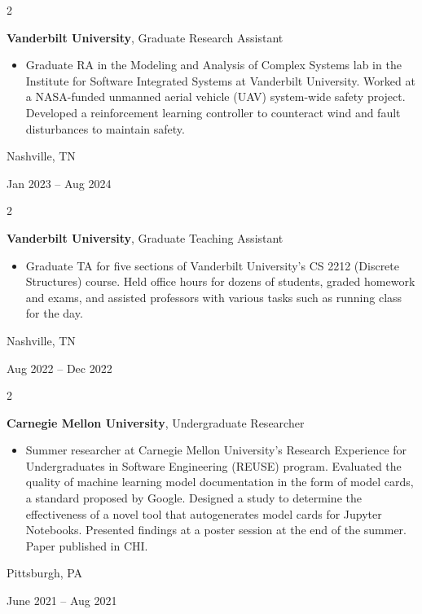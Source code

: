 \documentclass[10pt, letterpaper]{article}
\newenvironment{highlights}{
    \begin{itemize}[
        topsep=0.10 cm,
        parsep=0.10 cm,
        partopsep=0pt,
        itemsep=0pt,
        leftmargin=0.4 cm + 10pt
    ]
}{
    \end{itemize}
} %
\newenvironment{twocolentry}[2][]{
    \onecolentry
    \def\secondColumn{#2}
    \setcolumnwidth{\fill, 4.5 cm}
    \begin{paracol}{2}
}{
    \switchcolumn \raggedleft \secondColumn
    \end{paracol}
    \endonecolentry
} %
\begin{document}
        \vspace{0.2 cm}

        \begin{twocolentry}{
            Nashville, TN

        Jan 2023 – Aug 2024
        }
            \textbf{Vanderbilt University}, Graduate Research Assistant
            \begin{highlights}
                \item Graduate RA in the Modeling and Analysis of Complex Systems lab in the Institute for Software Integrated Systems at Vanderbilt University. Worked at a NASA-funded unmanned aerial vehicle (UAV) system-wide safety project. Developed a reinforcement learning controller to counteract wind and fault disturbances to maintain safety.
            \end{highlights}
        \end{twocolentry}


        \vspace{0.2 cm}

        \begin{twocolentry}{
            Nashville, TN

        Aug 2022 – Dec 2022
        }
            \textbf{Vanderbilt University}, Graduate Teaching Assistant
            \begin{highlights}
                \item Graduate TA for five sections of Vanderbilt University's CS 2212 (Discrete Structures) course. Held office hours for dozens of students, graded homework and exams, and assisted professors with various tasks such as running class for the day.
            \end{highlights}
        \end{twocolentry}


        \vspace{0.2 cm}

        \begin{twocolentry}{
            Pittsburgh, PA

        June 2021 – Aug 2021
        }
            \textbf{Carnegie Mellon University}, Undergraduate Researcher
            \begin{highlights}
                \item Summer researcher at Carnegie Mellon University’s Research Experience for Undergraduates in Software Engineering (REUSE) program. Evaluated the quality of machine learning model documentation in the form of model cards, a standard proposed by Google. Designed a study to determine the effectiveness of a novel tool that autogenerates model cards for Jupyter Notebooks. Presented findings at a poster session at the end of the summer. Paper published in CHI.
            \end{highlights}
        \end{twocolentry}
\end{document}
